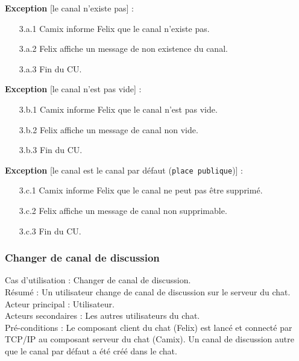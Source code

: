 \medskip
\textbf{Exception} [le canal n'existe pas] :
\begin{enumerate}
\item[3.a.1] Camix informe Felix que le canal n'existe pas.
\item[3.a.2] Felix affiche un message de non existence du canal.
\item[3.a.3] Fin du CU.
\end{enumerate}

\medskip
\textbf{Exception} [le canal n'est pas vide] :
\begin{enumerate}
\item[3.b.1] Camix informe Felix que le canal n'est pas vide.
\item[3.b.2] Felix affiche un message de canal non vide.
\item[3.b.3] Fin du CU.
\end{enumerate}

\medskip
\textbf{Exception} [le canal est le canal par défaut (\texttt{place publique})] :
\begin{enumerate}
\item[3.c.1] Camix informe Felix que le canal ne peut pas être supprimé.
\item[3.c.2] Felix affiche un message de canal non supprimable.
\item[3.c.3] Fin du CU.
\end{enumerate}

\subsubsection{Changer de canal de discussion}
\label{sec:cu:canaux:changer}

\noindent
Cas d'utilisation : Changer de canal de discussion.\\
Résumé : Un utilisateur change de canal de discussion sur le serveur du chat.\\
Acteur principal : Utilisateur.\\
Acteurs secondaires : Les autres utilisateurs du chat.\\
Pré-conditions : Le composant client du chat (Felix) est lancé et connecté par TCP/IP au composant serveur du chat (Camix). Un canal de discussion autre que le canal par défaut a été créé dans le chat.

